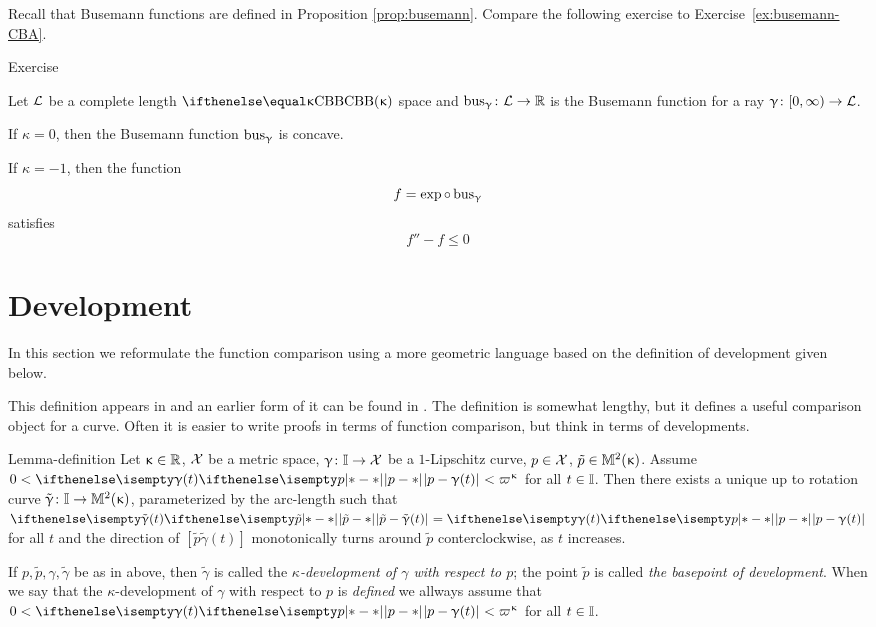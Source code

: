 Recall that Busemann functions are defined in Proposition \ref{prop:busemann}.
Compare the following exercise to Exercise~\ref{ex:busemann-CBA}.

\begin{thm}{Exercise}\label{ex:busemann-CBB}
{\sloppy 
Let $\mathcal{L}$ be a complete length $\Alex{\kappa}$ space
and $\bus_\gamma\:\spc{L}\to \RR$ is the Busemann function for a ray $\gamma\:[0,\infty)\to \spc{L}$.

}

\begin{subthm}{}
If $\kappa=0$, then the Busemann function $\mathop{\rm bus}\nolimits_\upgamma$ is  concave.
\end{subthm}

\begin{subthm}{}
If $\kappa=-1$, then the function 
\[f=\exp\circ\bus_\gamma\] 
satisfies
\[f''- f\le 0\]
\end{subthm}

\end{thm}

\section{Development}

In this section we reformulate the function comparison using a more geometric language based on the definition of development given below.

This definition appears in \cite{alexandrov:devel}
and an earlier form of it can be found in \cite{liberman}.
The definition is somewhat lengthy, but it defines a useful comparison object for a curve. 
Often it is easier to write proofs in terms of function comparison,
but think in terms of developments.

\begin{thm}{Lemma-definition}\label{lem:devel}\label{def:devel}
Let $\kappa\in \RR$, 
$\mathcal{X}$ be a metric space, 
$\gamma\:\II\to \spc{X}$ be a $1$-Lipschitz curve,
$p\in \spc{X}$,
$\tilde p\in\Lob2{\kappa}$.
Assume $0<\dist{p}{\gamma(t)}{} < \varpi\kappa$ for
all $t\in \II$.
Then there exists a unique up to rotation curve
$\tilde \gamma\: \II\to \Lob2\kappa$, parameterized by the arc-length 
such that
$\dist{\tilde p}{\tilde \gamma(t)}{}=\dist{p}{\gamma(t)}{}$ for all $t$
and the direction of
$[\tilde p\tilde \gamma(t)]$ monotonically turns around $\tilde p$ conterclockwise, as $t$ increases.

\smallskip

If $p,\tilde p,\gamma,\tilde \gamma$ be as in above,
then $\tilde \gamma$ is called the \emph{$\kappa$-development of $\gamma$
with respect to $p$}; 
the point $\tilde p$ is called \emph{the basepoint of development}.
When we say that the $\kappa$-development of $\gamma$ with respect to $p$ is \emph{defined} we allways assume that $0<\dist{p}{\gamma(t)}{} < \varpi\kappa$ for
all 
$t\in \II$.
\end{thm}

